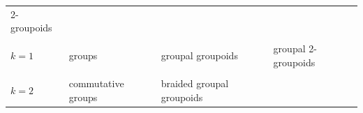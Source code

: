 \documentclass{article}
\begin{document}
\begin{longtable}[]{@{}llll@{}}
\begin{minipage}[t]{0.21\columnwidth}
2-groupoids\strut
\end{minipage}\tabularnewline
\begin{minipage}[t]{0.26\columnwidth}\raggedright
\strut
\end{minipage} & \begin{minipage}[t]{0.21\columnwidth}\raggedright
\strut
\end{minipage} & \begin{minipage}[t]{0.21\columnwidth}\raggedright
\strut
\end{minipage} & \begin{minipage}[t]{0.21\columnwidth}\raggedright
\strut
\end{minipage}\tabularnewline
\begin{minipage}[t]{0.26\columnwidth}\raggedright
\(k=1\)\strut
\end{minipage} & \begin{minipage}[t]{0.21\columnwidth}\raggedright
groups\strut
\end{minipage} & \begin{minipage}[t]{0.21\columnwidth}\raggedright
groupal groupoids\strut
\end{minipage} & \begin{minipage}[t]{0.21\columnwidth}\raggedright
groupal 2-groupoids\strut
\end{minipage}\tabularnewline
\begin{minipage}[t]{0.26\columnwidth}\raggedright
\strut
\end{minipage} & \begin{minipage}[t]{0.21\columnwidth}\raggedright
\strut
\end{minipage} & \begin{minipage}[t]{0.21\columnwidth}\raggedright
\strut
\end{minipage} & \begin{minipage}[t]{0.21\columnwidth}\raggedright
\strut
\end{minipage}\tabularnewline
\begin{minipage}[t]{0.26\columnwidth}\raggedright
\(k=2\)\strut
\end{minipage} & \begin{minipage}[t]{0.21\columnwidth}\raggedright
commutative groups\strut
\end{minipage} & \begin{minipage}[t]{0.21\columnwidth}\raggedright
braided groupal groupoids\strut
\end{minipage} & \begin{minipage}[t]{0.21\columnwidth}\raggedright

\end{minipage}
\end{longtable}
\end{document}
